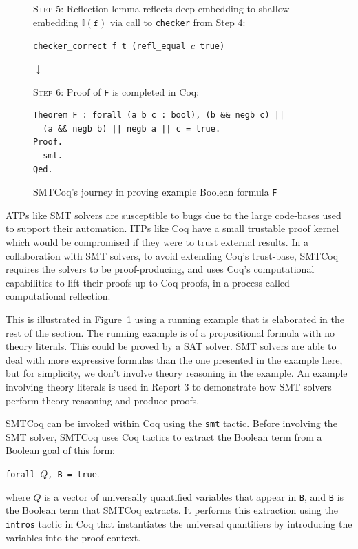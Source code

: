 \documentclass[11pt]{article}
\begin{document}
\begin{figure}
\begin{framed}
			\textsc{Step 5}: Reflection lemma 
			reflects deep embedding to shallow 
			embedding $\mathbb{I}(\texttt{f})$
			via call to \texttt{checker} from 
			Step 4:
			\begin{center}
				\texttt{checker\_correct f t 
					(refl\_equal $c$ true)}
			\end{center}
		\end{framed}
		\vspace{-0.3in}
		\begin{center}
			$\downarrow$
		\end{center}
		\vspace{-0.3in}
		\begin{framed}
			\textsc{Step 6}: Proof of \texttt{F} is 
			completed in Coq:
			\begin{verbatim}
Theorem F : forall (a b c : bool), (b && negb c) || 
  (a && negb b) || negb a || c = true.
Proof.
  smt.
Qed.
			\end{verbatim}
		\end{framed}
		\caption{SMTCoq's journey in proving 
			example Boolean formula \texttt{F}}
		\label{fig:smtcoqex}
	\end{figure}
	
	ATPs like SMT solvers are susceptible 
	to bugs due to the large code-bases 
	used to support	their automation. 
	ITPs like Coq have a small trustable 
	proof kernel which would be 
	compromised if they were to trust
	external results. In a collaboration
	with SMT solvers, to avoid extending 
	Coq's trust-base, SMTCoq requires the 
	solvers to be proof-producing, and uses 
	Coq's computational capabilities 
	to lift their proofs up to Coq proofs, 
	in a process called computational 
	reflection. 
	
	This is illustrated in 
	Figure~\ref{fig:smtcoqex} using a 
	running example that is elaborated 
	in the rest of the section. The running
	example is of a propositional formula
	with no theory literals. This could be 
	proved by a SAT solver. SMT solvers 
	are able to deal with more expressive 
	formulas than the one presented in the 
	example here, but for simplicity,
	we don't involve theory reasoning
	in the example. An example involving 
	theory literals is used in Report 3 
	to demonstrate how SMT solvers 
	perform theory reasoning and produce
	proofs.
	
	SMTCoq can be invoked within Coq 
	using the \texttt{smt} tactic.
	Before involving the SMT solver, 
	SMTCoq uses Coq tactics to extract
	the Boolean term from a
	Boolean goal of this form:
	\begin{center}
		\texttt{forall $Q$, \texttt{B} = true}.
	\end{center}
	where $Q$ is a vector of universally 
	quantified variables that appear in 
	\texttt{B}, and \texttt{B} is the Boolean
	term that SMTCoq extracts. It performs 
	this extraction using the \texttt{intros}
	tactic in Coq that instantiates the 
	universal quantifiers by introducing 
	the variables into the proof context.
	
\end{document}
